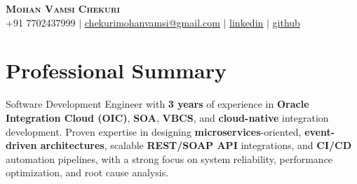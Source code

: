 \documentclass[letterpaper,11pt]{article}
\begin{document}
\begin{center}
    \textbf{\Huge \scshape Mohan Vamsi Chekuri} \\ \vspace{1pt}
    \small +91 7702437999 $|$ \href{mailto:chekurimohanvamsi@gmail.com}{\underline{chekurimohanvamsi@gmail.com}} $|$
    \href{https://www.linkedin.com/in/mvamsi73}{\underline{linkedin}} $|$
    \href{https://github.com}{\underline{github}}
\end{center}

\section{Professional Summary}
Software Development Engineer with \textbf{3 years} of experience in \textbf{Oracle Integration Cloud (OIC)}, \textbf{SOA}, \textbf{VBCS}, and \textbf{cloud-native} integration development. Proven expertise in designing \textbf{microservices}-oriented, \textbf{event-driven architectures}, scalable \textbf{REST/SOAP API} integrations, and \textbf{CI/CD} automation pipelines, with a strong focus on system reliability, performance optimization, and root cause analysis.
\end{document}
